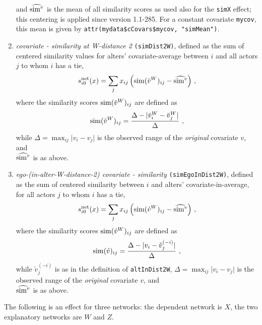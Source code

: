 \documentclass[a4paper,fleqn,11pt]{article}
\newcommand{\+}{\, + \,}
\newcommand{\vit}{\theenumi}
\newcounter{savenumi}
\begin{document}
\begin{enumerate}
 and $\widehat{{\rm sim}^v}$ is the mean of all similarity scores as used also
 for the \texttt{simX} effect; this centering is applied since version 1.1-285.
 For a constant covariate \texttt{mycov}, this mean is given by
 \texttt{attr(mydata\$cCovars\$mycov, "simMean")}.\\

 \item \emph{covariate - similarity at W-distance 2} \texttt{(simDist2W)}, %
      defined as the sum of centered similarity
      values for alters' covariate-average between $i$ and all actors
      $j$ to whom $i$ has a tie,
\[
 s^{\rm net}_{i\vit}(x) = \sum_j x_{ij}\, \Big({\rm sim}(\breve v^W)_{ij}
  -  \widehat{{\rm sim}^v}\Big) \ ,
\]
 where the similarity scores ${\rm sim}(\breve v^W)_{ij}$ are defined as
\[
{\rm sim}(\breve v^W)_{ij}=
 \frac{\Delta-\vert \breve v_i^W - \breve v_j^W \vert}{\Delta} \ ,
\]
 while
 $\Delta=\max_{ij}\vert v_i - v_j \vert$ is the observed range of the
 \emph{original} covariate $v$, and\\
  $\widehat{{\rm sim}^v}$ is as above.

\item \emph{ego-(in-alter-W-distance-2) covariate - similarity} \texttt{(simEgoInDist2W)},
      defined as the sum of centered similarity  between $i$
      and alters' covariate-in-average, for all actors
      $j$ to whom $i$ has a tie,
\[
 s^{\rm net}_{i\vit}(x) = \sum_j x_{ij}\, \Big({\rm sim}(\acute v^W)_{ij}
  - \widehat{{\rm sim}^v}\Big) \ ,
\]
 where the similarity scores ${\rm sim}(\acute v^W)_{ij}$ are defined as
\[
{\rm sim}(\acute v)_{ij}=
 \frac{\Delta-\vert  v_i - \check v_j^{(-i)} \vert}{\Delta} \ ,
\]
 while
 $ \check v_j^{(-i)}$ is as in the definition of \texttt{altInDist2W},
 $\Delta=\max_{ij}\vert v_i - v_j \vert$ is the observed range of the
 \emph{original} covariate $v$, and\\
 $\widehat{{\rm sim}^v}$ is as above.

\setcounter{savenumi}{\value{enumi}}
\end{enumerate}

\noindent
The following is an effect for three networks:
the dependent network is $X$, the two explanatory networks are $W$ and $Z$.
\end{document}
